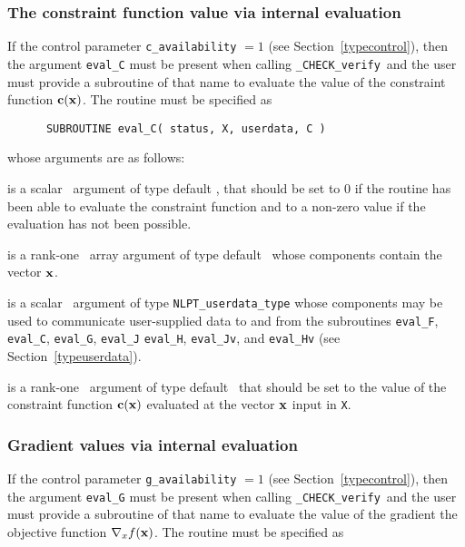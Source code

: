 \documentclass{galahad}
\newcommand{\packagename}{CHECK}
\newcommand{\fullpackagename}{\libraryname\_\packagename}
\newcommand{\solver}{{\tt \fullpackagename\_verify}}
\begin{document}
\subsubsection{The constraint function value via internal evaluation\label{cfv}}

If the control parameter {\tt c\_availability} $=1$ (see
Section~\ref{typecontrol}), then the argument
{\tt eval\_C} must be present when calling \solver\ and the
user must provide a subroutine of that name to evaluate the
value of the constraint function ${\mathbf{c}}({\mathbf{x}})$.
The routine must be specified as

\def\baselinestretch{0.8}
{\tt \begin{verbatim}
      SUBROUTINE eval_C( status, X, userdata, C ) \end{verbatim} }
\def\baselinestretch{1.0}
\noindent whose arguments are as follows:

\begin{description}
 is a scalar \intentout\ argument of type default \integer,
that should be set to 0 if the routine has been able to evaluate 
the constraint function
and to a non-zero value if the evaluation has not been possible.

 is a rank-one \intentin\ array argument of type default \realdp\
whose components contain the vector ${\mathbf{x}}$.

 is a scalar \intentinout\ argument of type 
{\tt NLPT\_userdata\_type} whose components may be used
to communicate user-supplied data to and from the
subroutines {\tt eval\_F}, {\tt eval\_C}, {\tt eval\_G}, {\tt eval\_J}
{\tt eval\_H}, {\tt eval\_Jv}, and {\tt eval\_Hv} 
(see Section~\ref{typeuserdata}). 

 is a rank-one \intentout\ argument of type default \realdp\
that should be set to the value of the constraint function ${\mathbf{c}}({\mathbf{x}})$
evaluated at the vector ${\mathbf{x}}$ input in {\tt X}.

\end{description}


\subsubsection{Gradient values via internal evaluation\label{gfv}}

If the control parameter {\tt g\_availability} $=1$ (see
Section~\ref{typecontrol}), then the argument {\tt eval\_G} must be
present when calling \solver\ and the
user must provide a subroutine of that name to evaluate the
value of the gradient the objective function $\nabla_x f({\mathbf{x}})$.
The routine must be specified as
\end{document}
